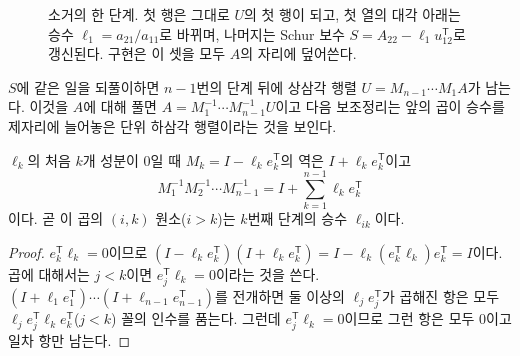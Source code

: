 \begin{figure}[htbp]
\centering
{}
\caption{소거의 한 단계. 첫 행은 그대로 $U$의 첫 행이 되고, 첫 열의 대각 아래는 승수 $\ell_1=a_{21}/a_{11}$로 바뀌며, 나머지는 Schur 보수 $S=A_{22}-\ell_1u_{12}^{\mathsf T}$로 갱신된다. 구현은 이 셋을 모두 $A$의 자리에 덮어쓴다.}
\label{fig:lu-step}
\end{figure}

$S$에 같은 일을 되풀이하면 $n-1$번의 단계 뒤에 상삼각 행렬 $U=M_{n-1}\cdots M_1A$가 남는다. 이것을 $A$에 대해 풀면 $A=M_1^{-1}\cdots M_{n-1}^{-1}U$이고 다음 보조정리는 앞의 곱이 승수를 제자리에 늘어놓은 단위 하삼각 행렬이라는 것을 보인다.

\begin{lemma}
\label{lem:lu-multipliers}
$\ell_k$의 처음 $k$개 성분이 $0$일 때 $M_k=I-\ell_ke_k^{\mathsf T}$의 역은 $I+\ell_ke_k^{\mathsf T}$이고
\[
M_1^{-1}M_2^{-1}\cdots M_{n-1}^{-1}=I+\sum_{k=1}^{n-1}\ell_ke_k^{\mathsf T}
\]
이다. 곧 이 곱의 $(i,k)$ 원소($i>k$)는 $k$번째 단계의 승수 $\ell_{ik}$이다.
\end{lemma}

\begin{proof}
$e_k^{\mathsf T}\ell_k=0$이므로 $(I-\ell_ke_k^{\mathsf T})(I+\ell_ke_k^{\mathsf T})=I-\ell_k(e_k^{\mathsf T}\ell_k)e_k^{\mathsf T}=I$이다. 곱에 대해서는 $j<k$이면 $e_j^{\mathsf T}\ell_k=0$이라는 것을 쓴다. $(I+\ell_1e_1^{\mathsf T})\cdots(I+\ell_{n-1}e_{n-1}^{\mathsf T})$를 전개하면 둘 이상의 $\ell_je_j^{\mathsf T}$가 곱해진 항은 모두 $\ell_{j}e_{j}^{\mathsf T}\ell_{k}e_k^{\mathsf T}$($j<k$) 꼴의 인수를 품는다. 그런데 $e_j^{\mathsf T}\ell_k=0$이므로 그런 항은 모두 $0$이고 일차 항만 남는다.
\end{proof}

